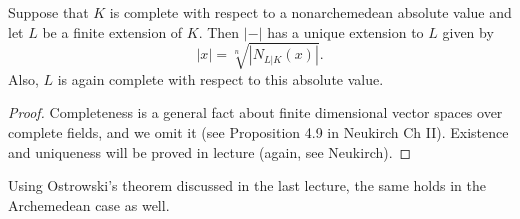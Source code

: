 \begin{theorem}
  Suppose that $K$ is complete with respect to a nonarchemedean absolute value and let $L$ be a finite extension of $K$.
  Then $|-|$ has a unique extension to $L$ given by
  \[ |x| = \sqrt[n]{|N_{L|K}(x)|}. \]
  Also, $L$ is again complete with respect to this absolute value.
\end{theorem}
\begin{proof}
  Completeness is a general fact about finite dimensional vector spaces over complete fields, and we omit it (see Proposition 4.9 in Neukirch Ch II).
  Existence and uniqueness will be proved in lecture (again, see Neukirch).
\end{proof}
\begin{remark}
  Using Ostrowski's theorem discussed in the last lecture, the same holds in the Archemedean case as well.
\end{remark}


